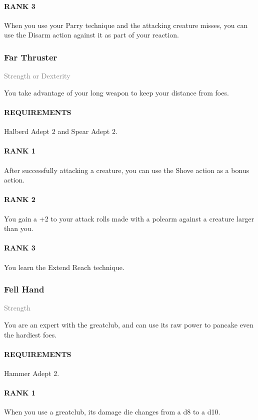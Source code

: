 \paragraph{RANK 3} When you use your Parry technique and the attacking creature misses, you can use the Disarm action against it as part of your reaction.

\subsubsection{Far Thruster} \label{feat::farthruster}
\small{\textcolor{gray}{Strength or Dexterity}}

\normalsize
You take advantage of your long weapon to keep your distance from foes.
\paragraph{REQUIREMENTS} Halberd Adept 2 and Spear Adept 2.
\paragraph{RANK 1} After successfully attacking a creature, you can use the Shove action as a bonus action.
\paragraph{RANK 2} You gain a +2 to your attack rolls made with a polearm against a creature larger than you.
\paragraph{RANK 3} You learn the Extend Reach technique.

\subsubsection{Fell Hand} \label{feat::fellhand}
\small{\textcolor{gray}{Strength}}

\normalsize
You are an expert with the greatclub, and can use its raw power to pancake even the hardiest foes.
\paragraph{REQUIREMENTS} Hammer Adept 2.
\paragraph{RANK 1} When you use a greatclub, its damage die changes from a d8 to a d10.
